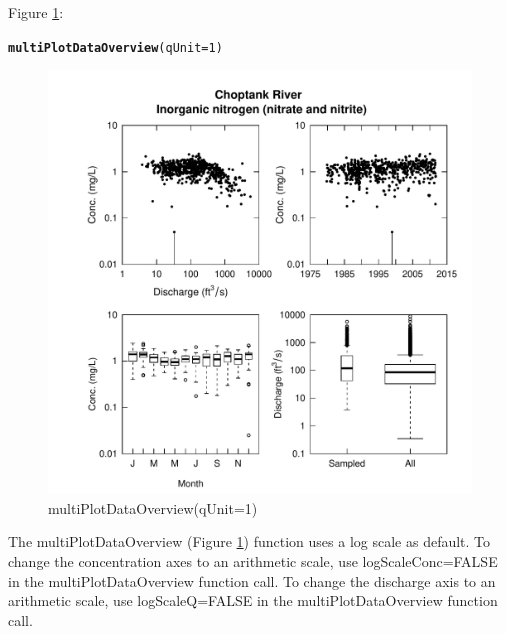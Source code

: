 \documentclass[a4paper,11pt]{article}\usepackage[]{graphicx}\usepackage[]{color}
\makeatletter
\newcommand{\hlnum}[1]{\textcolor[rgb]{0.686,0.059,0.569}{#1}}%
\newcommand{\hlstd}[1]{\textcolor[rgb]{0.345,0.345,0.345}{#1}}%
\newcommand{\hlkwc}[1]{\textcolor[rgb]{0.333,0.667,0.333}{#1}}%
\newcommand{\hlkwd}[1]{\textcolor[rgb]{0.737,0.353,0.396}{\textbf{#1}}}%
\newenvironment{kframe}{%
 \def\at@end@of@kframe{}%
 \ifinner\ifhmode%
  \def\at@end@of@kframe{\end{minipage}}%
  \begin{minipage}{\columnwidth}%
 \fi\fi%
 \def\FrameCommand##1{\hskip\@totalleftmargin \hskip-\fboxsep
 \colorbox{shadecolor}{##1}\hskip-\fboxsep
     \hskip-\linewidth \hskip-\@totalleftmargin \hskip\columnwidth}%
 \MakeFramed {\advance\hsize-\width
   \@totalleftmargin\z@ \linewidth\hsize
   \@setminipage}}%
 {\par\unskip\endMakeFramed%
 \at@end@of@kframe}
\newenvironment{knitrout}{}{} %
\makeatother
\begin{document}
Figure \ref{fig:multiPlotDataOverview}:
\begin{knitrout}
\color{fgcolor}\begin{kframe}
\begin{alltt}
\hlkwd{multiPlotDataOverview}\hlstd{(}\hlkwc{qUnit}\hlstd{=}\hlnum{1}\hlstd{)}
\end{alltt}
\end{kframe}\begin{figure}[]

\includegraphics[width=1\linewidth,height=1\linewidth]{figure/multiPlotDataOverview} \caption[multiPlotDataOverview(qUnit=1)]{multiPlotDataOverview(qUnit=1)\label{fig:multiPlotDataOverview}}
\end{figure}


\end{knitrout}


The multiPlotDataOverview (Figure \ref{fig:multiPlotDataOverview}) function uses a log scale as default. To change the concentration axes to an arithmetic scale, use logScaleConc=FALSE in the multiPlotDataOverview function call. To change the discharge axis to an arithmetic scale, use logScaleQ=FALSE in the multiPlotDataOverview function call.

\FloatBarrier

\end{document}
